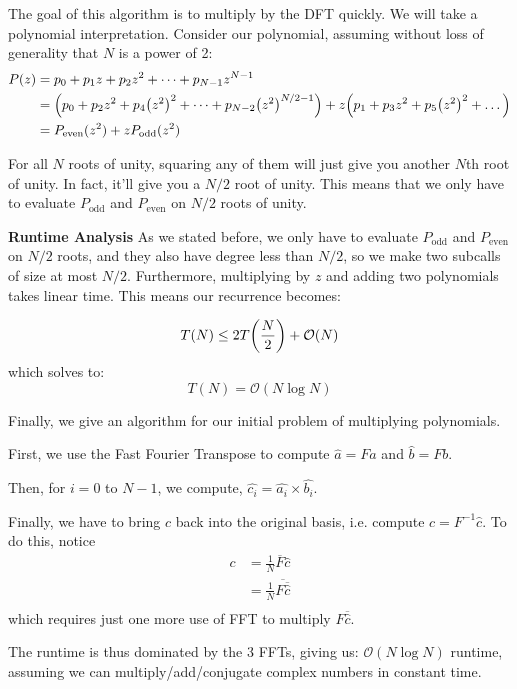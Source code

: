 \begin{algothm} 
    The goal of this algorithm is to multiply by the DFT quickly. We will take a polynomial interpretation.
    Consider our polynomial, assuming without loss of generality that $N$ is a power of 2:
    \begin{align*}
        P(z) &= p_0 + p_1z + p_2z^2 + \dots + p_{N - 1}z^{N - 1} \\
        &= \qty(p_0 + p_2z^2 + p_4\qty(z^2)^2 + \dots + p_{N - 2}\qty(z^2)^{N/2 - 1}) + z \qty(p_1 + p_3z^2 + p_5\qty(z^2)^2 + \dots) \\
        &= P_{\text{even}}(z^2) + zP_{\text{odd}}(z^2)
    \end{align*}

    For all $N$ roots of unity, squaring any of them will just give you another $N$th root of unity.
    In fact, it'll give you a $N/2$ root of unity. This means that we only have to evaluate $P_{\text{odd}}$ and
    $P_{\text{even}}$ on $N/2$ roots of unity.
    
    \textbf{Runtime Analysis} As we stated before, we only have to evaluate $P_{\text{odd}}$ and $P_{\text{even}}$
    on $N/2$ roots, and they also have degree less than $N/2$, so we make two subcalls of size at most $N/2$. 
    Furthermore, multiplying by $z$ and adding two polynomials takes linear time. This means our recurrence becomes:

    \[ T(N) \leq 2 T\qty(\frac{N}{2}) + \mathcal{O}(N) \]
    which solves to:
    \[ T(N) = \mathcal{O}(N \log N) \]
\end{algothm}

Finally, we give an algorithm for our initial problem of multiplying polynomials.
\begin{algothm} 
    First, we use the Fast Fourier Transpose to compute $\hat{a} = Fa$ and $\hat{b} = Fb$.
    
    Then, for $i = 0$ to $N - 1$, we compute,
    $\hat{c_i}  = \hat{a_i} \times \hat{b_i}$.
    
    Finally, we have to bring $c$ back into the original basis, i.e. compute
    $c = F^{-1} \hat{c}$. To do this, notice
    \begin{align*}
        c &= \frac{1}{N} \overline{F} \hat{c} \\
        &= \frac{1}{N} \overline{F \overline{\hat{c}}} \\
    \end{align*}
    which requires just one more use of FFT to multiply $F \overline{\hat{c}}$.

    The runtime is thus dominated by the 3 FFTs, giving us:
    $\mathcal{O}(N \log N)$ runtime, assuming we can multiply/add/conjugate complex numbers
    in constant time.
\end{algothm}

